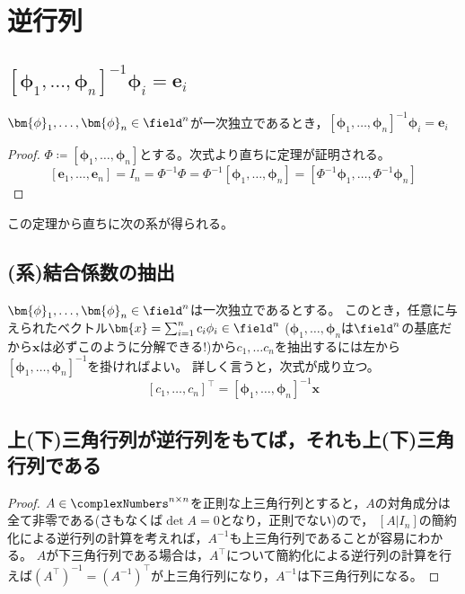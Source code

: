 \chapter{逆行列}
    \section{\texorpdfstring{$[\bm{\phi}_1,\dotsc,\bm{\phi}_n]^{-1}\bm{\phi}_i=\bm{e}_i$}{[φ1,...,φn]\string^(-1)φi = ei}}
        \label{逆行列にその構成縦ベクトルを掛ける}
        \begin{shadebox}
            $\bm{\phi}_1,\dotsc,\bm{\phi}_n\in\field^n$が一次独立であるとき，$[\bm{\phi}_1,\dotsc,\bm{\phi}_n]^{-1}\bm{\phi}_i=\bm{e}_i$
        \end{shadebox}
        \begin{proof}
            \quad\par
            $\Phi \coloneq [\bm{\phi}_1,\dotsc,\bm{\phi}_n]$とする。次式より直ちに定理が証明される。
            \[[\bm{e}_1,\dotsc,\bm{e}_n] = I_n = \Phi^{-1}\Phi = \Phi^{-1}[\bm{\phi}_1,\dotsc,\bm{\phi}_n] = [\Phi^{-1}\bm{\phi}_1,\dotsc,\Phi^{-1}\bm{\phi}_n]\]
        \end{proof}
        この定理から直ちに次の系が得られる。
    \section{(系)結合係数の抽出}
        \begin{shadebox}
            $\bm{\phi}_1,\dotsc,\bm{\phi}_n\in\field^n$は一次独立であるとする。
            このとき，任意に与えられたベクトル$\bm{x} = \sum_{i=1}^{n}{c_i\phi_i}\in\field^n$ ($\bm{\phi}_1,\dotsc,\bm{\phi}_n$は$\field^n$の基底だから$\bm{x}$は必ずこのように分解できる!)から$c_1,\dotsc c_n$を抽出するには左から$[\bm{\phi}_1,\dotsc,\bm{\phi}_n]^{-1}$を掛ければよい。
            詳しく言うと，次式が成り立つ。
            \[[c_1,\dots,c_n]^\top = [\bm{\phi}_1,\dotsc,\bm{\phi}_n]^{-1}\bm{x}\]
        \end{shadebox}
    \section{上(下)三角行列が逆行列をもてば，それも上(下)三角行列である}
        \begin{proof}
            \quad\par
            $A\in \complexNumbers^{n\times n}$を正則な上三角行列とすると，$A$の対角成分は全て非零である(さもなくば$\det{A}=0$となり，正則でない)ので，
            $[A|I_n]$の簡約化による逆行列の計算を考えれば，$A^{-1}$も上三角行列であることが容易にわかる。
            $A$が下三角行列である場合は，$A^\top$について簡約化による逆行列の計算を行えば$(A^\top)^{-1} = (A^{-1})^\top$が上三角行列になり，$A^{-1}$は下三角行列になる。
        \end{proof}
